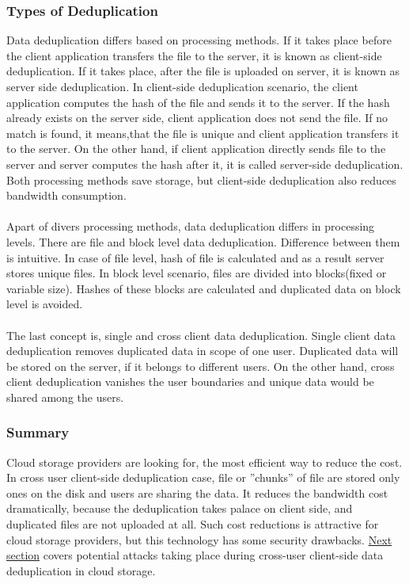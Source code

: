 \documentclass[12pt]{article}
\begin{document}
\subsubsection{Types of Deduplication}
\label{subsub:TypesOfDedup}
Data deduplication differs based on processing methods. If it takes place before the client application transfers the file to the server, it is known as client-side deduplication. If it takes place, after the file is uploaded on server, it is known as server side deduplication. In client-side deduplication scenario, the client application computes the hash of the file and sends it to the server. If the hash already exists on the server side, client application does not send the file. If no match is found, it means,that the file is unique and client application transfers it to the server. On the other hand, if client application directly sends file to the server and server computes the hash after it, it is called server-side deduplication. Both processing methods save storage, but client-side deduplication also reduces bandwidth consumption.\cite{DeDupMethods}\\\\
Apart of divers processing methods, data deduplication differs in processing levels. There are file  and block level data deduplication. Difference between them is intuitive. In case of file level, hash of file is calculated and as a result server stores unique files. In block level scenario, files are divided into blocks(fixed or variable size). Hashes of these blocks are calculated and duplicated data on block level is avoided. \cite{DeDupMethods}\\\\
The last concept is, single and cross client data deduplication. Single client data deduplication removes duplicated data  in scope of one user. Duplicated data will be stored on the server, if it belongs to different users. On the other hand, cross client deduplication vanishes the user boundaries and unique data would be shared among the users.\cite{DeDupMethods}

\subsubsection{Summary}
\label{subsub:SummaryDedup}
Cloud storage providers are looking for, the most efficient way to reduce the cost. In cross user client-side deduplication  case, file or ”chunks” of file are stored only ones on the disk and users are sharing the data. It reduces the bandwidth cost dramatically, because the deduplication takes palace on client side, and duplicated files are not uploaded at all.\cite{DeDupDropBox} Such cost reductions is attractive for cloud storage providers, but this technology has some security drawbacks. \hyperref[sub:ConfidentialityAndPrivacy]{Next section} covers potential attacks taking place during cross-user client-side data deduplication in cloud storage.
\end{document}
